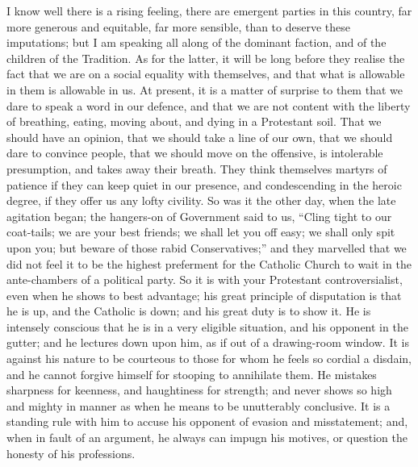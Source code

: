 I know well there is a rising feeling, there are
emergent parties in this country, far more generous and
equitable, far more sensible, than to deserve these
imputations; but I am speaking all along of the dominant
faction, and of the children of the Tradition. As for the
latter, it will be long before they realise the fact that
we are on a social equality with themselves, and that
what is allowable in them is allowable in us. At present,
it is a matter of surprise to them that we dare to speak
a word in our defence, and that we are not content with
the liberty of breathing, eating, moving about, and dying
in a Protestant soil. That we should have an opinion,
that we should take a line of our own, that we should
dare to convince people, that we should move on the
offensive, is intolerable presumption, and takes away
their breath. They think themselves martyrs of patience
if they can keep quiet in our presence, and condescending
in the heroic degree, if they offer us any lofty
civility. So was it the other day, when the late
agitation began; the hangers-on of Government said to us,
``Cling tight to our coat-tails; we are your best
friends; we shall let you off easy; we shall only spit
upon you; but beware of those rabid Conservatives;''
and they marvelled that we did not feel it to be the
highest preferment for the Catholic Church to wait in the
ante-chambers of a political party. So it is with your
Protestant controversialist, even when he shows to best
advantage; his great principle of disputation is that he
is up, and the Catholic is down; and his great duty is to
show it. He is intensely conscious that he is in a very
eligible situation, and his opponent in the gutter; and
he lectures down upon him, as if out of a drawing-room
window. It is against his nature to be courteous to those
for whom he feels so cordial a disdain, and he cannot
forgive himself for stooping to annihilate them. He
mistakes sharpness for keenness, and haughtiness for
strength; and never shows so high and mighty in manner as
when he means to be unutterably conclusive. It is a
standing rule with him to accuse his opponent of evasion
and misstatement; and, when in fault of an argument, he
always can impugn his motives, or question the honesty of
his professions.

